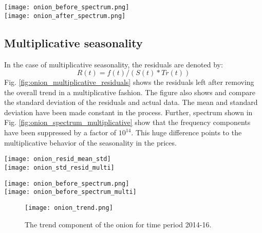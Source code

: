 \documentclass{article}
\begin{document}
\begin{figure*}
	\texttt{[image: onion\_before\_spectrum.png]}\\
	\texttt{[image: onion\_after\_spectrum.png]}
	\caption{Spectrum of onion prices before and after removing overall trend. The frequencies have been suppressed by a factor of 10. }
	\label{fig:onion_spectrum}
\end{figure*}
\subsection{Multiplicative seasonality}

In the case of multiplicative seasonality, the residuals are denoted by:
\begin{equation}
R(t) = f(t) /(S(t)*Tr(t))
\end{equation}
Fig. \ref{fig:onion_multiplicative_residuals} shows the residuals left after removing the overall trend in a multiplicative fashion. The figure also shows and compare the standard deviation of the residuals and actual data. The mean and standard deviation have been made constant in the process. Further, spectrum shown in Fig. \ref{fig:onion_spectrum_multiplicative} show that the frequency components have been suppressed by a factor of $10^{14}$. This huge difference points to the multiplicative behavior of the seasonality in the prices.

\begin{figure*}
	\texttt{[image: onion\_resid\_mean\_std]}\\
	\texttt{[image: onion\_std\_resid\_multi]}
	\caption{Top figure shows the data with its moving average and standard deviation of the residuals after removing multiplicative seasonality. The bottom figure shows the comparison of standard deviation before and after removing the overall trend. }
	\label{fig:onion_multiplicative_residuals}
\end{figure*}
\begin{figure*}
	\texttt{[image: onion\_before\_spectrum.png]}\\
	\texttt{[image: onion\_before\_spectrum\_multi]}
	\caption{Spectrum of onion prices before and after removing overall trend. The frequencies have been suppressed by a factor of $10^{14}$. }
	\label{fig:onion_spectrum_multiplicative}
\end{figure*}
\clearpage
\begin{figure}
	\texttt{[image: onion\_trend.png]}\\
	\caption{The trend component of the onion for time period 2014-16. }
	\label{fig:onion_trend}
\end{figure}
\end{document}
